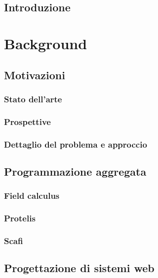 \documentclass[%
  a4paper,                %
  12pt,                   %
  twoside,                %
  openright,              %
  titlepage,              %
  final                   %
]{scrbook}
\begin{document}
  \frontmatter{}
  \pagestyle{empty}
  
  
  
  
  \tableofcontents

  \mainmatter{}
  \pagestyle{headings}

  \begin{abstract}
  \end{abstract}

  \chapter*{Introduzione}

  \part{Background}
    \chapter{Motivazioni}
      \section{Stato dell'arte}
      \section{Prospettive}
      \section{Dettaglio del problema e approccio}

    \chapter{Programmazione aggregata}
      \section{Field calculus}
      \section{Protelis}
      \section{Scafi}

    \chapter{Progettazione di sistemi web}
\end{document}
